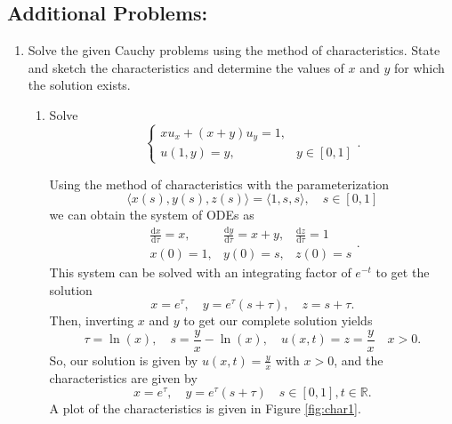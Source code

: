 \documentclass[a4paper,12pt]{article}
\newcommand{\reals}{\mathbb{R}}
\newcommand{\dd}{\mathrm{d}}
\begin{document}
\subsection*{Additional Problems:}
	\begin{enumerate}[label = \arabic*.]
		\item Solve the given Cauchy problems using the method of characteristics. State and sketch the characteristics and determine the values of $ x $ and $ y $ for which the solution exists.
		\begin{enumerate}[label = (\alph*)]
			\item Solve
			\[
				\begin{cases}
					x u_x + (x + y)u_y = 1, \\
					u(1,y) = y, & y \in [0,1]
				\end{cases}.
			\]
			
			Using the method of characteristics with the parameterization
			\[
				\langle x(s), y(s), z(s) \rangle = \langle 1, s, s \rangle, \quad s \in [0,1]
			\]
			we can obtain the system of ODEs as
			\[
				\begin{array}{ccc}
					\frac{\dd x}{\dd \tau} = x, & \frac{\dd y}{\dd \tau} = x + y, & \frac{\dd z}{\dd \tau} = 1 \\
					x(0) = 1, & y(0) = s, & z(0) = s
				\end{array}.
			\]
			This system can be solved with an integrating factor of $ e^{-t} $ to get the solution
			\[
				x = e^\tau, \quad y = e^\tau (s + \tau), \quad z = s + \tau.
			\]
			Then, inverting $ x $ and $ y $ to get our complete solution yields
			\[
				\tau = \ln(x), \quad s = \frac{y}{x} - \ln(x), \quad u(x,t) = z = \frac{y}{x} \quad x > 0.
			\]
			So, our solution is given by $ u(x, t) = \frac{y}{x} $ with $ x > 0 $, and the characteristics are given by
			\[
				x = e^\tau, \quad y = e^\tau (s + \tau) \quad s \in [0, 1], t \in \reals.
			\]
			A plot of the characteristics is given in Figure \ref{fig:char1}.
			

\end{enumerate}
\end{enumerate}
\end{document}
